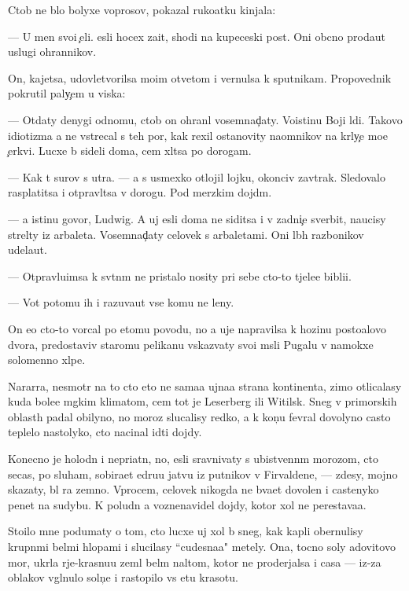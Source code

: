 \documentclass[10pt]{book}
\begin{document}
Ctob{\yi} ne b{\yi}lo bolyxe voprosov, pokazal ruko{\y}atku kinjala:

— U men{\ia} svo{\y}i {\c}eli. {\Y}esli hocex za{\x}it{\yi}, shodi na kupeceski{\y} post. Oni ob{\yi}cno proda{\y}ut uslugi ohrannikov.

On, kajetsa, udovletvorilsa mo{\y}im otvetom i vernulsa k sputnikam. Pro\-po\-ved\-nik pokrutil paly{\c}em u viska:

— Otdaty denygi odnomu, ctob{\yi} on ohran{\ia}l vosemnad{\c}aty. Voistinu Boj{\y}i l{\io}di. Takovo idiotizma {\y}a ne vstrecal s teh por, kak rexil ostanovity na{\y}om\-ni\-kov na kr{\yi}ly{\c}e mo{\y}e{\y} {\c}erkvi. Lucxe b{\yi} sideli doma, cem xl{\ia}tsa po dorogam.

— Kak t{\yi} surov s utra. — {\Y}a s usmexko{\y} otlojil lojku, okonciv zavtrak. Sledovalo rasplatitsa i otpravl{\ia}tsa v do\-ro\-gu. Pod merzkim dojd{\e}m.

— {\Y}a istinu govor{\io}, Ludwig. A uj {\y}esli doma ne siditsa i v zadni{\c}e sverbit, naucisy strel{\ia}ty iz arbaleta. Vosemnad{\c}aty celovek s arbaletami. Oni l{\io}b{\yi}h razbo{\y}nikov udela{\y}ut.

— Otpravl{\ia}{\y}u{\x}imsa k sv{\ia}t{\yi}n{\ia}m ne pristalo nosity pri sebe cto-to t{\ia}jele{\y}e bibli{\y}i.

— Vot potomu ih i razuva{\y}ut vse komu ne leny.

On {\y}e{\x}o cto-to vorcal po etomu povodu, no {\y}a uje napravilsa k hoz{\ia}{\y}inu posto{\y}alovo dvora, predostaviv staromu pelikanu v{\yi}skaz{\yi}vaty svo{\y}i m{\yi}sli Pugalu v namokxe{\y} solomenno{\y} xl{\ia}pe.



Nararra, ne\-smo\-tr{\ia} na to cto eto ne sama{\y}a {\y}ujna{\y}a strana kontinenta, zimo{\y} otlicalasy kuda bole{\y}e m{\ia}gkim klimatom, cem tot je Leserberg ili Witilsk. Sneg v primorskih oblast{\ia}h padal obilyno, no moroz{\yi} slucalisy redko, a k kon{\c}u fevral{\ia} dovolyno casto teplelo nastolyko, cto nacinal idti dojdy.

Konecno je holodn{\yi}{\y} i nepri{\y}atn{\yi}{\y}, no, {\y}esli sravnivaty s ubi{\y}stvenn{\yi}m morozom, cto se{\y}cas, po sluham, sobira{\y}et {\x}edru{\y}u jatvu iz putnikov v Firvaldene, — zdesy, mojno skazaty, b{\yi}l ra{\y} zemno{\y}. Vprocem, celovek nikogda ne b{\yi}\-va\-{\y}et do\-vo\-len i castenyko pen{\ia}{\y}et na sudybu. K poludn{\io} {\y}a voznenavidel dojdy, kotor{\yi}{\y} xol ne perestava{\y}a.

Stoilo mne podumaty o tom, cto lucxe uj xol b{\yi} sneg, kak kapli obernulisy krup\-n{\yi}\-mi bel{\yi}mi hlop{\y}ami i slucilasy ``cudesna{\y}a" metely. Ona, tocno soly {\Y}adovitovo mor{\ia}, ukr{\yi}la r{\yi}je-krasnu{\y}u zeml{\io} bel{\yi}m nal{\e}tom, kotor{\yi}{\y} ne proderjalsa i casa — iz-za oblakov v{\yi}gl{\ia}nulo soln{\c}e i rastopilo vs{\io} etu krasotu.
\end{document}
